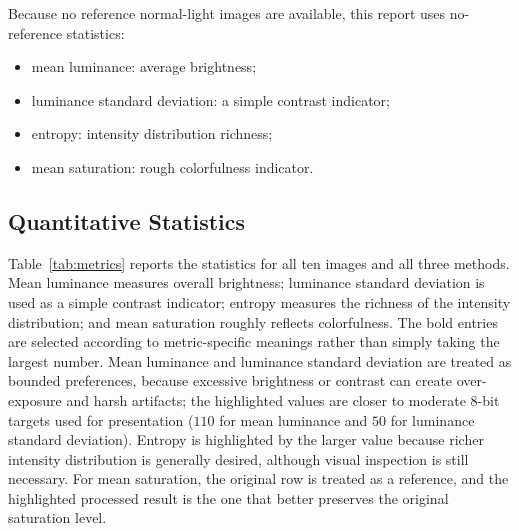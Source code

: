 \documentclass[11pt,a4paper]{article}
\begin{document}
Because no reference normal-light images are available, this report uses no-reference statistics:
\begin{itemize}
  \item mean luminance: average brightness;
  \item luminance standard deviation: a simple contrast indicator;
  \item entropy: intensity distribution richness;
  \item mean saturation: rough colorfulness indicator.
\end{itemize}

\subsection{Quantitative Statistics}

Table~\ref{tab:metrics} reports the statistics for all ten images and all three methods. Mean luminance measures overall brightness; luminance standard deviation is used as a simple contrast indicator; entropy measures the richness of the intensity distribution; and mean saturation roughly reflects colorfulness. The bold entries are selected according to metric-specific meanings rather than simply taking the largest number. Mean luminance and luminance standard deviation are treated as bounded preferences, because excessive brightness or contrast can create over-exposure and harsh artifacts; the highlighted values are closer to moderate 8-bit targets used for presentation ($110$ for mean luminance and $50$ for luminance standard deviation). Entropy is highlighted by the larger value because richer intensity distribution is generally desired, although visual inspection is still necessary. For mean saturation, the original row is treated as a reference, and the highlighted processed result is the one that better preserves the original saturation level.
\end{document}
